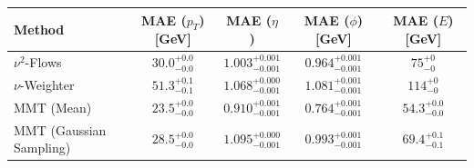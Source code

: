     \begin{tabular}{lcccc}
        \toprule
        Method & MAE ($p_T$) [GeV] & MAE ($\eta$) & MAE ($\phi$) [GeV] & MAE ($E$) [GeV] \\
        \midrule
        $\nu^2$-Flows & $30.0_{-0.0}^{+0.0}$ & $1.003_{-0.001}^{+0.001}$ & $0.964_{-0.001}^{+0.001}$ & $75_{-0}^{+0}$ \\
        $\nu$-Weighter & $51.3_{-0.1}^{+0.1}$ & $1.068_{-0.001}^{+0.000}$ & $1.081_{-0.001}^{+0.001}$ & $114_{-0}^{+0}$ \\
        MMT (Mean) & $23.5_{-0.0}^{+0.0}$ & $0.910_{-0.001}^{+0.001}$ & $0.764_{-0.001}^{+0.001}$ & $54.3_{-0.0}^{+0.0}$ \\
        MMT (Gaussian Sampling) & $28.5_{-0.0}^{+0.0}$ & $1.095_{-0.001}^{+0.000}$ & $0.993_{-0.001}^{+0.001}$ & $69.4_{-0.1}^{+0.1}$ \\
        \bottomrule
    \end{tabular}